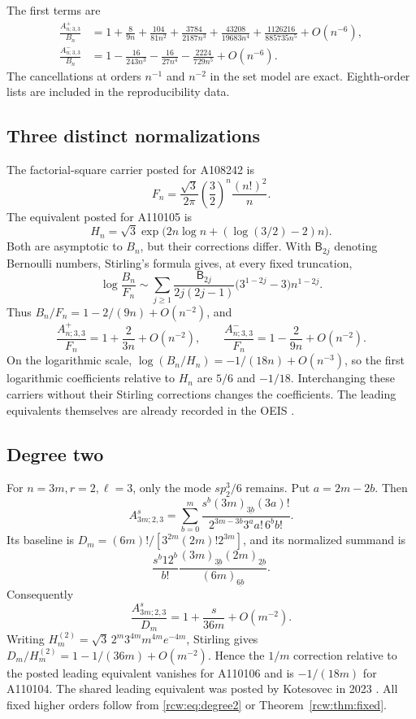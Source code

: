 \documentclass[11pt]{article}
\theoremstyle{definition}\newtheorem{definition}[theorem]{Definition}
\theoremstyle{remark}\newtheorem{remark}[theorem]{Remark}
\newcommand{\fall}[2]{(#1)_{\underline{#2}}}
\numberwithin{equation}{section}
\begin{document}
The first terms are
\begin{align}
 \frac{A^+_{n;3,3}}{B_n}
 &=1+\frac8{9n}+\frac{104}{81n^2}+\frac{3784}{2187n^3}
    +\frac{43208}{19683n^4}+\frac{1126216}{885735n^5}
    +O(n^{-6}),\label{rcw:eq:fixedplus}\\
 \frac{A^-_{n;3,3}}{B_n}
 &=1-\frac{16}{243n^3}-\frac{16}{27n^4}
       -\frac{2224}{729n^5}+O(n^{-6}).\label{rcw:eq:fixedminus}
\end{align}
The cancellations at orders $n^{-1}$ and $n^{-2}$ in the set model are exact. Eighth-order lists are included in the reproducibility data.

\subsection{Three distinct normalizations}
The factorial-square carrier posted for A108242 is
\[
 F_n=\frac{\sqrt3}{2\pi}\left(\frac32\right)^n\frac{(n!)^2}{n}.
\]
The equivalent posted for A110105 is
\[
 H_n=\sqrt3\exp\bigl(2n\log n+(\log(3/2)-2)n\bigr).
\]
Both are asymptotic to $B_n$, but their corrections differ. With $\mathsf B_{2j}$ denoting Bernoulli numbers, Stirling's formula gives, at every fixed truncation,
\begin{equation}\label{rcw:eq:carrier}
 \log\frac{B_n}{F_n}\sim
 \sum_{j\ge1}\frac{\mathsf B_{2j}}{2j(2j-1)}
          \bigl(3^{1-2j}-3\bigr)n^{1-2j}.
\end{equation}
Thus $B_n/F_n=1-2/(9n)+O(n^{-2})$, and
\[
 \frac{A^+_{n;3,3}}{F_n}=1+\frac{2}{3n}+O(n^{-2}),\qquad
 \frac{A^-_{n;3,3}}{F_n}=1-\frac{2}{9n}+O(n^{-2}).
\]
On the logarithmic scale, $\log(B_n/H_n)=-1/(18n)+O(n^{-3})$, so the first logarithmic coefficients relative to $H_n$ are $5/6$ and $-1/18$. Interchanging these carriers without their Stirling corrections changes the coefficients. The leading equivalents themselves are already recorded in the OEIS \cite{oeis108242,oeis110105}.

\subsection{Degree two}
For $n=3m,r=2,\ell=3$, only the mode $s p_2^3/6$ remains. Put $a=2m-2b$. Then
\begin{equation}\label{rcw:eq:degree2}
 A^s_{3m;2,3}=\sum_{b=0}^m
  \frac{s^b\fall{3m}{3b}(3a)!}
       {2^{3m-3b}3^a a!\,6^b b!}.
\end{equation}
Its baseline is $D_m=(6m)!/[3^{2m}(2m)!2^{3m}]$, and its normalized summand is
\[
 \frac{s^b12^b}{b!}
 \frac{\fall{3m}{3b}\fall{2m}{2b}}{\fall{6m}{6b}}.
\]
Consequently
\[
 \frac{A^s_{3m;2,3}}{D_m}=1+\frac{s}{36m}+O(m^{-2}).
\]
Writing $H^{(2)}_m=\sqrt3\,2^m3^{4m}m^{4m}e^{-4m}$, Stirling gives $D_m/H^{(2)}_m=1-1/(36m)+O(m^{-2})$. Hence the $1/m$ correction relative to the posted leading equivalent vanishes for A110106 and is $-1/(18m)$ for A110104. The shared leading equivalent was posted by Kotesovec in 2023 \cite{oeis110106,oeis110104}. All fixed higher orders follow from \eqref{rcw:eq:degree2} or Theorem~\ref{rcw:thm:fixed}.
\end{document}
